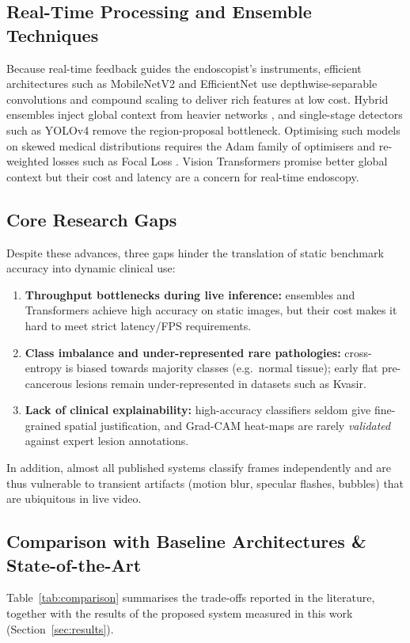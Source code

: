 \documentclass[conference]{IEEEtran}
\begin{document}
\subsection{Real-Time Processing and Ensemble Techniques}
Because real-time feedback guides the endoscopist's instruments, efficient architectures such as MobileNetV2
\cite{sandler2018mobilenetv2} and EfficientNet \cite{tan2019efficientnet} use depthwise-separable convolutions and
compound scaling to deliver rich features at low cost. Hybrid ensembles inject global context from heavier networks
\cite{mdpi2024ensemble}, and single-stage detectors such as YOLOv4 \cite{bochkovskiy2020yolov4} remove the
region-proposal bottleneck. Optimising such models on skewed medical distributions requires the Adam family of
optimisers \cite{kingma2014adam, loshchilov2019adamw} and re-weighted losses such as Focal Loss \cite{lin2017focal}.
Vision Transformers \cite{dosovitskiy2020image} promise better global context but their cost and latency are a
concern for real-time endoscopy.

\subsection{Core Research Gaps}
Despite these advances, three gaps hinder the translation of static benchmark accuracy into dynamic clinical use:
\begin{enumerate}
\item \textbf{Throughput bottlenecks during live inference:} ensembles and Transformers achieve high accuracy on
static images, but their cost makes it hard to meet strict latency/FPS requirements.
\item \textbf{Class imbalance and under-represented rare pathologies:} cross-entropy is biased towards majority
classes (e.g.\ normal tissue); early flat pre-cancerous lesions remain under-represented in datasets such as Kvasir.
\item \textbf{Lack of clinical explainability:} high-accuracy classifiers seldom give fine-grained spatial
justification, and Grad-CAM heat-maps are rarely \emph{validated} against expert lesion annotations.
\end{enumerate}
In addition, almost all published systems classify frames independently and are thus vulnerable to transient
artifacts (motion blur, specular flashes, bubbles) that are ubiquitous in live video.

\subsection{Comparison with Baseline Architectures \& State-of-the-Art}
Table~\ref{tab:comparison} summarises the trade-offs reported in the literature, together with the results of the
proposed system measured in this work (Section~\ref{sec:results}).
\end{document}

